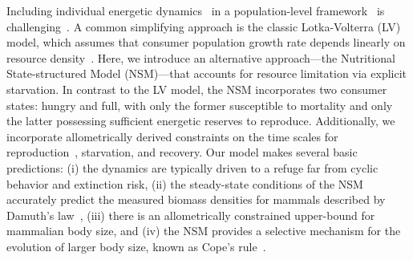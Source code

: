 \documentclass[twocolumn,preprintnumbers,amsmath,amssymb,superscriptaddress]{revtex4}
\begin{document}
Including individual energetic dynamics~\citep{Kooi2000} in a
population-level framework~\citep{Kooi2000,Sousa:2010ez} is
challenging~\citep{Diekmann:2010da}.  A common simplifying approach is the
classic Lotka-Volterra (LV) model, which assumes that consumer population
growth rate depends linearly on resource density~\citep{murdoch:2003}. Here,
we introduce an alternative approach---the Nutritional State-structured Model
(NSM)---that accounts for resource limitation via explicit starvation. In
contrast to the LV model, the NSM incorporates two consumer states: hungry
and full, with only the former susceptible to mortality and only the latter
possessing sufficient energetic reserves to reproduce.  Additionally, we
incorporate allometrically derived constraints on the time scales for
reproduction~\citep{Kempes:2012hy}, starvation, and recovery.  Our model
makes several basic predictions: (i) the dynamics are typically driven to a
refuge far from cyclic behavior and extinction risk, (ii) the steady-state
conditions of the NSM accurately predict the measured biomass densities for
mammals described by Damuth's law~\citep{Damuth:1987kr,allen2002,enquist1998,Pedersen:2017he},
(iii) there is an allometrically constrained upper-bound for mammalian body size, and
(iv) the NSM provides a selective mechanism for the evolution of larger body size, known as Cope's rule~\citep{Alroy:1998p1594,Clauset:2009fh,Smith:2010p3442,Saarinen:2014br}.


\end{document}
